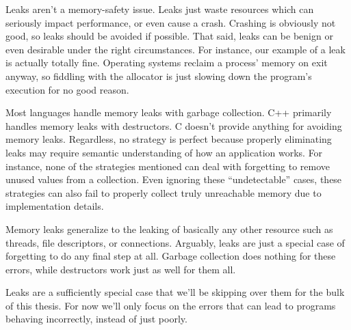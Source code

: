 Leaks aren't a memory-safety issue. Leaks just waste resources which can
seriously impact performance, or even cause a crash. Crashing is obviously not
good, so leaks should be avoided if possible. That said, leaks can be benign or
even desirable under the right circumstances. For instance, our example of a
leak is actually totally fine. Operating systems reclaim a process' memory on
exit anyway, so fiddling with the allocator is just slowing down the program's
execution for no good reason.

Most languages handle memory leaks with garbage collection. C++ primarily
handles memory leaks with destructors. C doesn't provide anything for avoiding
memory leaks. Regardless, no strategy is perfect because properly eliminating
leaks may require semantic understanding of how an application works. For
instance, none of the strategies mentioned can deal with forgetting to remove
unused values from a collection. Even ignoring these ``undetectable'' cases,
these strategies can also fail to properly collect truly unreachable memory
due to implementation details.

Memory leaks generalize to the leaking of basically any other resource such
as threads, file descriptors, or connections. Arguably, leaks are just a special
case of forgetting to do any final step at all. Garbage collection does nothing
for these errors, while destructors work just as well for them all.

Leaks are a sufficiently special case that we'll be skipping over them for
the bulk of this thesis. For now we'll only focus on the errors that can lead
to programs behaving incorrectly, instead of just poorly.



